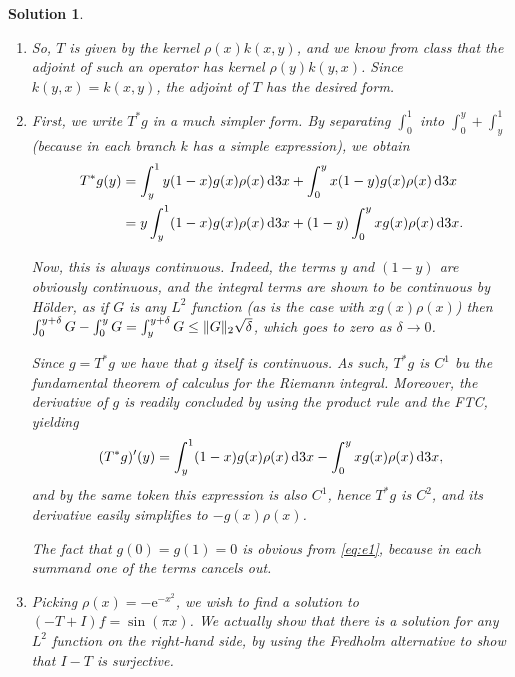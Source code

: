 \documentclass{article}
\theoremstyle{nonumberplain}
\newtheorem{sol}{Solution}
\newcommand{\e}{\mathrm{e}}
\DeclarePairedDelimiter{\Norm}{\lVert}{\rVert}
\begin{document}
\begin{sol}

\leavevmode
\begin{enumerate}
\item So, $T$ is given by the kernel $\rho(x) k(x,y)$, and we know from class that the adjoint of such an operator has kernel $\rho(y) k(y,x)$. Since $k(y,x) = k(x,y)$, the adjoint of $T$ has the desired form.
\item First, we write $T^* g$ in a much simpler form. By separating $\int_0^1$ into $\int_0^y + \int_y^1$ (because in each branch $k$ has a simple expression), we obtain
\begin{equation}\label{eq:e1}
\begin{aligned}
T^*g(y)
&= \int_y^1 y (1-x) g(x) \rho(x) \dl3 x + \int_0^y x (1-y) g(x) \rho(x) \dl3 x\\
&= y \int_y^1 (1-x) g(x) \rho(x) \dl3 x + (1-y) \int_0^y x g(x) \rho(x) \dl3 x.
\end{aligned}
\end{equation}

Now, this is always continuous. Indeed, the terms $y$ and $(1-y)$ are obviously continuous, and the integral terms are shown to be continuous by Hölder, as if $G$ is any $L^2$ function (as is the case with $x g(x) \rho(x)$) then $\int_0^{y+\delta} G - \int_0^y G = \int_y^{y+\delta} G \leq \Norm{G}_2 \sqrt\delta$, which goes to zero as $\delta \to 0$.

Since $g = T^* g$ we have that $g$ itself is continuous. As such, $T^* g$ is $C^1$ bu the fundamental theorem of calculus for the Riemann integral. Moreover, the derivative of $g$ is readily concluded by using the product rule and the FTC, yielding
\begin{equation}
(T^* g)'(y) = \int_y^1 (1-x) g(x) \rho(x) \dl3 x - \int_0^y x g(x) \rho(x) \dl3 x,
\end{equation}
and by the same token this expression is also $C^1$, hence $T^* g$ is $C^2$, and its derivative easily simplifies to $- g(x) \rho(x)$.

The fact that $g(0) = g(1) = 0$ is obvious from \eqref{eq:e1}, because in each summand one of the terms cancels out.

\item Picking $\rho(x) = -\e^{-x^2}$, we wish to find a solution to $(-T+I)f = \sin(\pi x)$. We actually show that there is a solution for any $L^2$ function on the right-hand side, by using the Fredholm alternative to show that $I-T$ is surjective.


\end{enumerate}
\end{sol}
\end{document}

